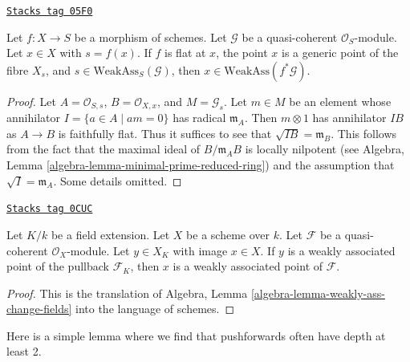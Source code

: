\begin{lemma}
\label{divisors-lemma-weakly-ass-pullback}
\href{https://stacks.math.columbia.edu/tag/05F0}{\texttt{Stacks tag 05F0}}

Let $f : X \to S$ be a morphism of schemes. Let $\mathcal{G}$ be a
quasi-coherent $\mathcal{O}_S$-module. Let $x \in X$ with $s = f(x)$.
If $f$ is flat at $x$, the point $x$ is a generic point of the fibre $X_s$, and
$s \in \text{WeakAss}_S(\mathcal{G})$, then
$x \in \text{WeakAss}(f^*\mathcal{G})$.
\end{lemma}

\begin{proof}
Let $A = \mathcal{O}_{S, s}$, $B = \mathcal{O}_{X, x}$, and
$M = \mathcal{G}_s$. Let $m \in M$ be an element whose annihilator
$I = \{a \in A \mid am = 0\}$ has radical $\mathfrak m_A$. Then
$m \otimes 1$ has annihilator $I B$ as $A \to B$ is
faithfully flat. Thus it suffices to see that $\sqrt{I B} = \mathfrak m_B$.
This follows from the fact that the maximal ideal of $B/\mathfrak m_AB$
is locally nilpotent (see
Algebra, Lemma \ref{algebra-lemma-minimal-prime-reduced-ring})
and the assumption that $\sqrt{I} = \mathfrak m_A$.
Some details omitted.
\end{proof}

\begin{lemma}
\label{divisors-lemma-weakly-ass-change-fields}
\href{https://stacks.math.columbia.edu/tag/0CUC}{\texttt{Stacks tag 0CUC}}

Let $K/k$ be a field extension. Let $X$ be a scheme over $k$.
Let $\mathcal{F}$ be a quasi-coherent $\mathcal{O}_X$-module.
Let $y \in X_K$ with image $x \in X$. If $y$ is a weakly
associated point of the pullback $\mathcal{F}_K$, then $x$
is a weakly associated point of $\mathcal{F}$.
\end{lemma}

\begin{proof}
This is the translation of
Algebra, Lemma \ref{algebra-lemma-weakly-ass-change-fields}
into the language of schemes.
\end{proof}

Here is a simple lemma where we find that pushforwards often have
depth at least 2.

